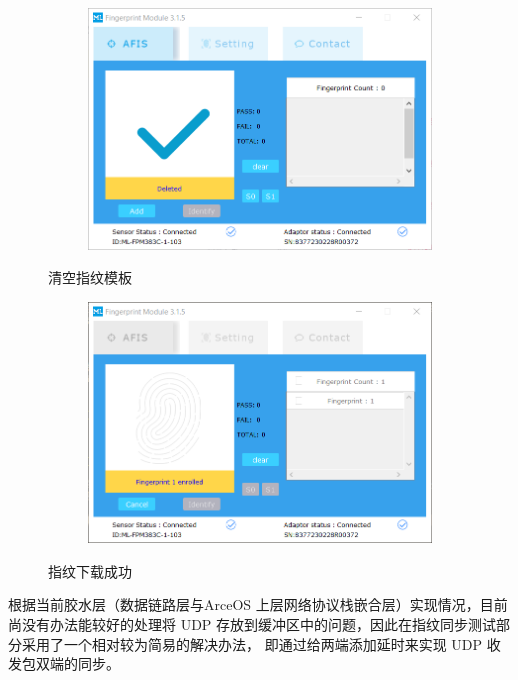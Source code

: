     \begin{figure}[ht]
        \centering
        \begin{subfigure}
            \centering
            \includegraphics[width=\textwidth]{./imgs/清空指纹模板.png}
        \end{subfigure}
        \caption{清空指纹模板} \label{tests::清空指纹模板}
        \hfill
        \begin{subfigure}
            \centering
            \includegraphics[width=\textwidth]{./imgs/注册指纹.png}
        \end{subfigure}
        \caption{指纹下载成功} \label{tests::指纹下载成功}
    \end{figure}

    根据当前胶水层（数据链路层与ArceOS 上层网络协议栈嵌合层）实现情况，目前尚没有办法能较好的处理将 UDP 存放到缓冲区中的问题，因此在指纹同步测试部分采用了一个相对较为简易的解决办法，
    即通过给两端添加延时来实现 UDP 收发包双端的同步。

